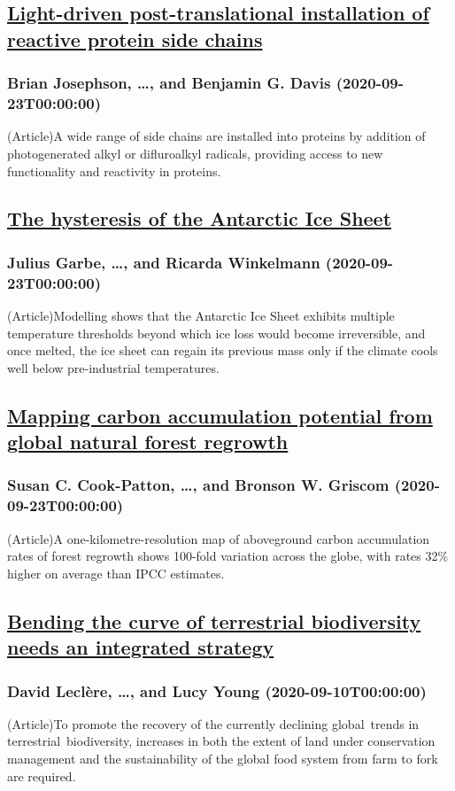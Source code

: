\subsection*{\href{https://www.nature.com/articles/s41586-020-2733-7}{Light-driven post-translational installation of reactive protein side chains}}
\subsubsection*{Brian Josephson, \dots, and Benjamin G. Davis (2020-09-23T00:00:00)}
(Article)A wide range of side chains are installed into proteins by addition of photogenerated alkyl or difluroalkyl radicals, providing access to new functionality and reactivity in proteins.
\subsection*{\href{https://www.nature.com/articles/s41586-020-2727-5}{The hysteresis of the Antarctic Ice Sheet}}
\subsubsection*{Julius Garbe, \dots, and Ricarda Winkelmann (2020-09-23T00:00:00)}
(Article)Modelling shows that the Antarctic Ice Sheet exhibits multiple temperature thresholds beyond which ice loss would become irreversible, and once melted, the ice sheet can regain its previous mass only if the climate cools well below pre-industrial temperatures.
\subsection*{\href{https://www.nature.com/articles/s41586-020-2686-x}{Mapping carbon accumulation potential from global natural forest regrowth}}
\subsubsection*{Susan C. Cook-Patton, \dots, and Bronson W. Griscom (2020-09-23T00:00:00)}
(Article)A one-kilometre-resolution map of aboveground carbon accumulation rates of forest regrowth shows 100-fold variation across the globe, with rates 32\% higher on average than IPCC estimates.
\subsection*{\href{https://www.nature.com/articles/s41586-020-2705-y}{Bending the curve of terrestrial biodiversity needs an integrated strategy}}
\subsubsection*{David Leclère, \dots, and Lucy Young (2020-09-10T00:00:00)}
(Article)To promote the recovery of the currently declining global trends in terrestrial biodiversity, increases in both the extent of land under conservation management and the sustainability of the global food system from farm to fork are required.
